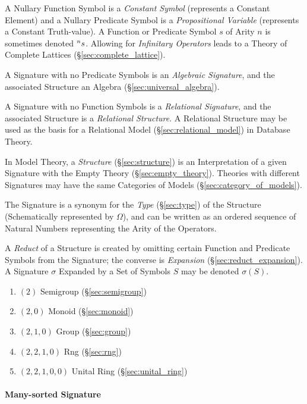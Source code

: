 A Nullary Function Symbol is a \emph{Constant Symbol} (represents a
Constant Element) and a Nullary Predicate Symbol is a
\emph{Propositional Variable} (represents a Constant Truth-value). A
Function or Predicate Symbol $s$ of Arity $n$ is sometimes denoted
$\prescript{n}{}{s}$. Allowing for \emph{Infinitary Operators} leads
to a Theory of Complete Lattices (\S\ref{sec:complete_lattice}).

A Signature with no Predicate Symbols is an \emph{Algebraic
  Signature}, and the associated Structure an Algebra
(\S\ref{sec:universal_algebra}).

A Signature with no Function Symbols is a \emph{Relational Signature},
and the associated Structure is a \emph{Relational Structure}. A
Relational Structure may be used as the basis for a Relational Model
(\S\ref{sec:relational_model}) in Database Theory.

In Model Theory, a \emph{Structure} (\S\ref{sec:structure}) is an
Interpretation of a given Signature with the Empty Theory
(\S\ref{sec:empty_theory}). Theories with different Signatures may
have the same Categories of Models (\S\ref{sec:category_of_models}).

The Signature is a synonym for the \emph{Type} (\S\ref{sec:type}) of
the Structure (Schematically represented by $\Omega$), and can be
written as an ordered sequence of Natural Numbers representing the
Arity of the Operators.

A \emph{Reduct} of a Structure is created by omitting certain Function
and Predicate Symbols from the Signature; the converse is
\emph{Expansion} (\S\ref{sec:reduct_expansion}). A Signature $\sigma$
Expanded by a Set of Symbols $S$ may be denoted $\sigma(S)$.

\begin{enumerate}
  \item $(2)$         Semigroup (\S\ref{sec:semigroup})
  \item $(2,0)$       Monoid (\S\ref{sec:monoid})
  \item $(2,1,0)$     Group (\S\ref{sec:group})
  \item $(2,2,1,0)$   Rng (\S\ref{sec:rng})
  \item $(2,2,1,0,0)$ Unital Ring (\S\ref{sec:unital_ring})
\end{enumerate}



\paragraph{Many-sorted Signature}\label{sec:manysorted_signature}\hfill

